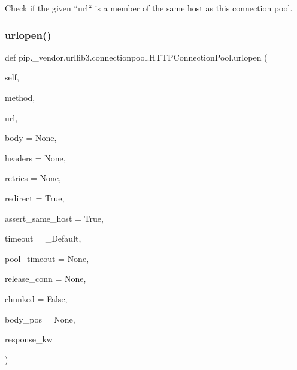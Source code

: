 \begin{DoxyVerb}Check if the given ``url`` is a member of the same host as this
connection pool.
\end{DoxyVerb}
 \mbox{\label{classpip_1_1__vendor_1_1urllib3_1_1connectionpool_1_1HTTPConnectionPool_a3f0bd3c72c7fc578162e68f3a57289fa}} 
\subsubsection{\texorpdfstring{urlopen()}{urlopen()}}
{\footnotesize\ttfamily def pip.\+\_\+vendor.\+urllib3.\+connectionpool.\+H\+T\+T\+P\+Connection\+Pool.\+urlopen (\begin{DoxyParamCaption}\item[{}]{self,  }\item[{}]{method,  }\item[{}]{url,  }\item[{}]{body = {\ttfamily None},  }\item[{}]{headers = {\ttfamily None},  }\item[{}]{retries = {\ttfamily None},  }\item[{}]{redirect = {\ttfamily True},  }\item[{}]{assert\+\_\+same\+\_\+host = {\ttfamily True},  }\item[{}]{timeout = {\ttfamily \+\_\+Default},  }\item[{}]{pool\+\_\+timeout = {\ttfamily None},  }\item[{}]{release\+\_\+conn = {\ttfamily None},  }\item[{}]{chunked = {\ttfamily False},  }\item[{}]{body\+\_\+pos = {\ttfamily None},  }\item[{}]{response\+\_\+kw }\end{DoxyParamCaption})}

